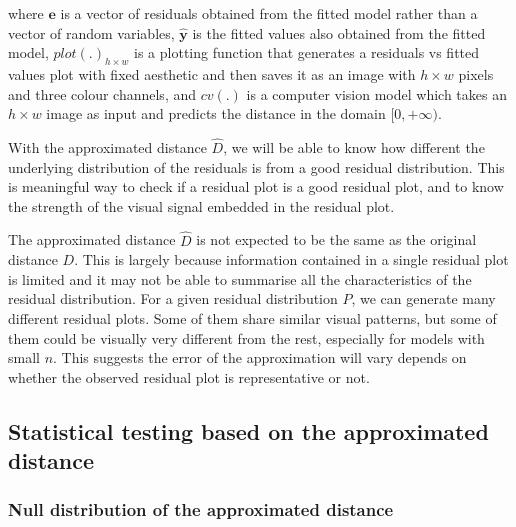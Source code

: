 \documentclass[]{interact}
\theoremstyle{plain}%
\theoremstyle{definition}
\theoremstyle{remark}
\begin{document}
\noindent where \(\boldsymbol{e}\) is a vector of residuals obtained
from the fitted model rather than a vector of random variables,
\(\hat{\boldsymbol{y}}\) is the fitted values also obtained from the
fitted model, \(plot(.)_{h \times w}\) is a plotting function that
generates a residuals vs fitted values plot with fixed aesthetic and
then saves it as an image with \(h \times w\) pixels and three colour
channels, and \(cv(.)\) is a computer vision model which takes an
\(h \times w\) image as input and predicts the distance in the domain
\([0, +\infty)\).

With the approximated distance \(\hat{D}\), we will be able to know how
different the underlying distribution of the residuals is from a good
residual distribution. This is meaningful way to check if a residual
plot is a good residual plot, and to know the strength of the visual
signal embedded in the residual plot.

The approximated distance \(\hat{D}\) is not expected to be the same as
the original distance \(D\). This is largely because information
contained in a single residual plot is limited and it may not be able to
summarise all the characteristics of the residual distribution. For a
given residual distribution \(P\), we can generate many different
residual plots. Some of them share similar visual patterns, but some of
them could be visually very different from the rest, especially for
models with small \(n\). This suggests the error of the approximation
will vary depends on whether the observed residual plot is
representative or not.

\hypertarget{statistical-testing-based-on-the-approximated-distance}{%
\subsection{Statistical testing based on the approximated
distance}\label{statistical-testing-based-on-the-approximated-distance}}

\hypertarget{null-distribution-of-the-approximated-distance}{%
\subsubsection{Null distribution of the approximated
distance}\label{null-distribution-of-the-approximated-distance}}
\end{document}
